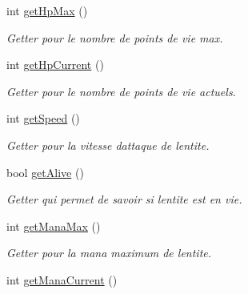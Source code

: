 \begin{DoxyCompactItemize}
\mbox{\label{classentite_ab8e6c4dd900884cba5bec025f1e55999}} 
int \hyperlink{classentite_ab8e6c4dd900884cba5bec025f1e55999}{get\+Hp\+Max} ()
\begin{DoxyCompactList}\small\item\em Getter pour le nombre de points de vie max. \end{DoxyCompactList}\item 
\mbox{\label{classentite_ae41fa12581d2f94d5f6ae67fec4e56e9}} 
int \hyperlink{classentite_ae41fa12581d2f94d5f6ae67fec4e56e9}{get\+Hp\+Current} ()
\begin{DoxyCompactList}\small\item\em Getter pour le nombre de points de vie actuels. \end{DoxyCompactList}\item 
\mbox{\label{classentite_ab97281eadee20e03fe497396439260c9}} 
int \hyperlink{classentite_ab97281eadee20e03fe497396439260c9}{get\+Speed} ()
\begin{DoxyCompactList}\small\item\em Getter pour la vitesse d\textquotesingle{}attaque de l\textquotesingle{}entite. \end{DoxyCompactList}\item 
\mbox{\label{classentite_a5a39811eb0c12ae85a23f152c8ba6d58}} 
bool \hyperlink{classentite_a5a39811eb0c12ae85a23f152c8ba6d58}{get\+Alive} ()
\begin{DoxyCompactList}\small\item\em Getter qui permet de savoir si l\textquotesingle{}entite est en vie. \end{DoxyCompactList}\item 
\mbox{\label{classentite_a427218420d74bdec1f79f93572ecf24a}} 
int \hyperlink{classentite_a427218420d74bdec1f79f93572ecf24a}{get\+Mana\+Max} ()
\begin{DoxyCompactList}\small\item\em Getter pour la mana maximum de l\textquotesingle{}entite. \end{DoxyCompactList}\item 
\mbox{\label{classentite_ad3e7a419d79d7d7e836243c4920703e3}} 
int \hyperlink{classentite_ad3e7a419d79d7d7e836243c4920703e3}{get\+Mana\+Current} ()

\end{DoxyCompactItemize}

